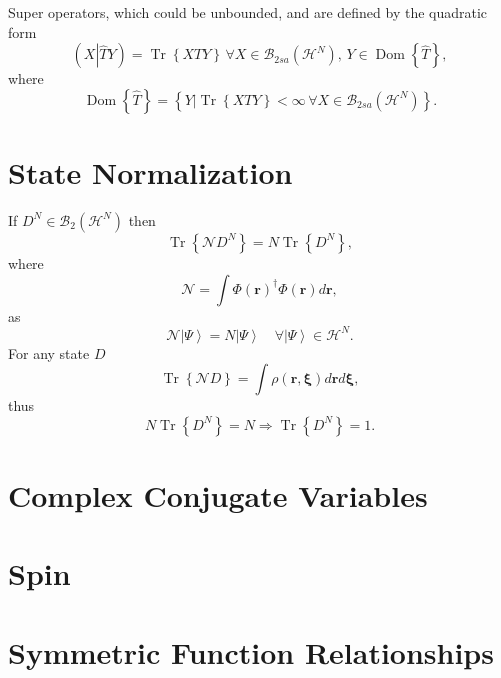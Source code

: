 \documentclass[aps,preprint]{revtex4}%
\begin{document}
Super operators, which could be unbounded, and are defined by the quadratic
form
\begin{equation}
\left(  X\left\vert \widehat{T}Y\right.  \right)  =\operatorname{Tr}\left\{
XTY\right\}  \,\forall X\in\mathcal{B}_{2sa}\left(  \mathcal{H}^{N}\right)
,\,Y\in\operatorname{Dom}\left\{  \widehat{T}\right\}  ,
\end{equation}
where
\[
\operatorname{Dom}\left\{  \widehat{T}\right\}  =\left\{  \left.  Y\right\vert
\operatorname{Tr}\left\{  XTY\right\}  <\infty\,\forall X\in\mathcal{B}%
_{2sa}\left(  \mathcal{H}^{N}\right)  \right\}  .
\]


\section{State Normalization \label{Normalization}}

If $D^{N}\in\mathcal{B}_{2}\left(  \mathcal{H}^{N}\right)  $ then
\begin{equation}
\operatorname{Tr}\left\{  \mathcal{N}D^{N}\right\}  =N\operatorname{Tr}%
\left\{  D^{N}\right\}  ,
\end{equation}
where
\begin{equation}
\mathcal{N}=\int\Phi\left(  \boldsymbol{r}\right)  ^{\dagger}\Phi\left(
\boldsymbol{r}\right)  d\boldsymbol{r,}%
\end{equation}
as
\begin{equation}
\mathcal{N}\left\vert \Psi\right\rangle =N\left\vert \Psi\right\rangle
\quad\forall\left\vert \Psi\right\rangle \in\mathcal{H}^{N}.
\end{equation}
For any state $D$
\begin{equation}
\operatorname{Tr}\left\{  \mathcal{N}D\right\}  =\int\rho\left(
\boldsymbol{r,\xi}\right)  d\boldsymbol{r}d\boldsymbol{\xi,}%
\end{equation}
thus
\begin{equation}
N\operatorname{Tr}\left\{  D^{N}\right\}  =N\Rightarrow\operatorname{Tr}%
\left\{  D^{N}\right\}  =1.
\end{equation}


\section{Complex Conjugate Variables \label{ComplexConjugate}}

\section{Spin\label{Spin}}

\section{Symmetric Function Relationships}



\end{document}
